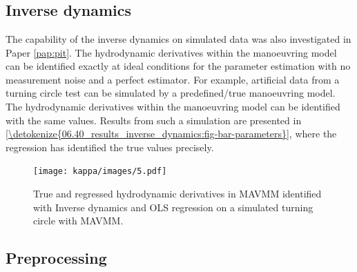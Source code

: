 \section*{}
\vspace{-1cm}
\subsection{Inverse dynamics}
\label{\detokenize{06.40_results_inverse_dynamics:inverse-dynamics}}\label{\detokenize{06.40_results_inverse_dynamics::doc}}
The capability of the inverse dynamics on simulated data was also investigated in Paper \ref{pap:pit}. The hydrodynamic derivatives within the manoeuvring model can be identified exactly at ideal conditions for the parameter estimation with no measurement noise and a perfect estimator. For example, artificial data from a turning circle test can be simulated by a predefined/true manoeuvring model. The hydrodynamic derivatives within the manoeuvring model can be identified with the same values. Results from such a simulation are presented in \hyperref[\detokenize{06.40_results_inverse_dynamics:fig-bar-parameters}]{\autoref{\detokenize{06.40_results_inverse_dynamics:fig-bar-parameters}}}, where the regression has identified the true values precisely.
\begin{figure}[h!]
\centering
\texttt{[image: kappa/images/5.pdf]}
\caption{True and regressed hydrodynamic derivatives in MAVMM identified with Inverse dynamics and OLS regression on a simulated turning circle with MAVMM.}\label{\detokenize{06.40_results_inverse_dynamics:fig-bar-parameters}}\end{figure}


\subsection{Preprocessing}
\label{\detokenize{06.31_results_noise:preprocessing}}\label{\detokenize{06.31_results_noise::doc}}

